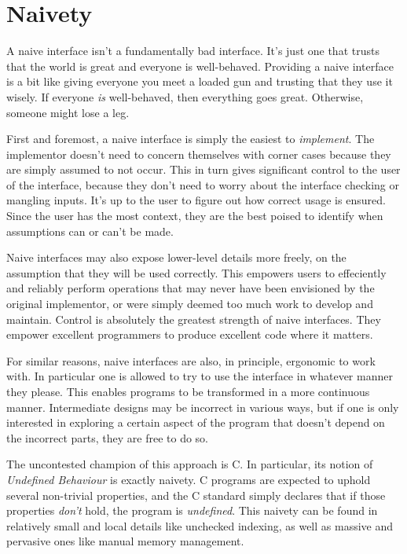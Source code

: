 \section{Naivety}

A naive interface isn't a fundamentally bad interface. It's just one that trusts
that the world is great and everyone is well-behaved. Providing a naive interface
is a bit like giving everyone you meet a loaded gun and trusting that they use
it wisely. If everyone \emph{is} well-behaved, then everything goes great. Otherwise,
someone might lose a leg.

First and foremost, a naive interface
is simply the easiest to \emph{implement}. The implementor doesn't need to concern
themselves with corner cases because they are simply assumed to not occur. This
in turn gives significant control to the user of the interface, because they don't
need to worry about the interface checking or mangling inputs. It's up to the user
to figure out how correct usage is ensured. Since the user has the most context,
they are the best poised to identify when assumptions can or can't be made.

Naive interfaces may also expose lower-level details more freely, on the
assumption that they will be used correctly. This empowers users to effeciently
and reliably perform operations that may never have been envisioned by the
original implementor, or were simply deemed too much work to develop and maintain.
Control is absolutely the greatest strength of naive interfaces. They empower
excellent programmers to produce excellent code where it matters.

For similar reasons, naive interfaces are also, in principle, ergonomic to work
with. In particular one is allowed to try to use the interface in whatever
manner they please. This enables programs to be transformed in a more continuous
manner. Intermediate designs may be incorrect in various ways, but if one is
only interested in exploring a certain aspect of the program that doesn't depend
on the incorrect parts, they are free to do so.

The uncontested champion of this approach is C. In particular, its notion of
\emph{Undefined Behaviour} is exactly naivety. C programs are expected to uphold
several non-trivial properties, and the C standard simply declares that if those
properties \emph{don't} hold, the program is \emph{undefined}. This naivety can be found in
relatively small and local details like unchecked indexing, as well as massive
and pervasive ones like manual memory management.

